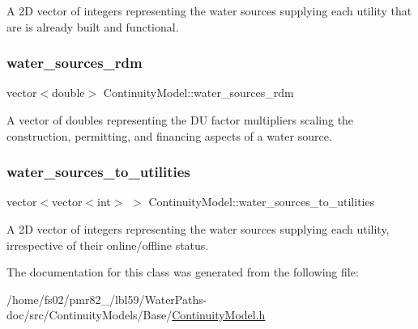 A 2D vector of integers representing the water sources supplying each utility that are is already built and functional. 

\mbox{\label{classContinuityModel_ab7b8fa93a6f56b328e425e1ead6cfefa}} 
\subsubsection{\texorpdfstring{water\+\_\+sources\+\_\+rdm}{water\_sources\_rdm}}
{\footnotesize\ttfamily vector$<$double$>$ Continuity\+Model\+::water\+\_\+sources\+\_\+rdm\hspace{0.3cm}{\ttfamily [protected]}}



A vector of doubles representing the DU factor multipliers scaling the construction, permitting, and financing aspects of a water source. 

\mbox{\label{classContinuityModel_ae8516bcbbf52650190277fc8b06c1843}} 
\subsubsection{\texorpdfstring{water\+\_\+sources\+\_\+to\+\_\+utilities}{water\_sources\_to\_utilities}}
{\footnotesize\ttfamily vector$<$vector$<$int$>$ $>$ Continuity\+Model\+::water\+\_\+sources\+\_\+to\+\_\+utilities\hspace{0.3cm}{\ttfamily [protected]}}



A 2D vector of integers representing the water sources supplying each utility, irrespective of their online/offline status. 



The documentation for this class was generated from the following file\+:\begin{DoxyCompactItemize}
\item 
/home/fs02/pmr82\+\_/lbl59/\+Water\+Paths-\/doc/src/\+Continuity\+Models/\+Base/\mbox{\hyperlink{ContinuityModel_8h}{Continuity\+Model.\+h}}\end{DoxyCompactItemize}
